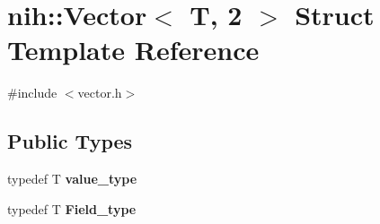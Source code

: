 \hypertarget{structnih_1_1_vector_3_01_t_00_012_01_4}{
\section{nih\-:\-:\-Vector$<$ \-T, 2 $>$ \-Struct \-Template \-Reference}
\label{structnih_1_1_vector_3_01_t_00_012_01_4}
}


{\ttfamily \#include $<$vector.\-h$>$}

\subsection*{\-Public \-Types}
\begin{DoxyCompactItemize}
\item 
\hypertarget{structnih_1_1_vector_3_01_t_00_012_01_4_ae964137a735ee491d62e6ff067316fb1}{
typedef \-T {\bfseries value\-\_\-type}}
\label{structnih_1_1_vector_3_01_t_00_012_01_4_ae964137a735ee491d62e6ff067316fb1}

\item 
\hypertarget{structnih_1_1_vector_3_01_t_00_012_01_4_a22788e3c8f6a85d80ff47ad963043921}{
typedef \-T {\bfseries \-Field\-\_\-type}}
\label{structnih_1_1_vector_3_01_t_00_012_01_4_a22788e3c8f6a85d80ff47ad963043921}

\end{DoxyCompactItemize}
